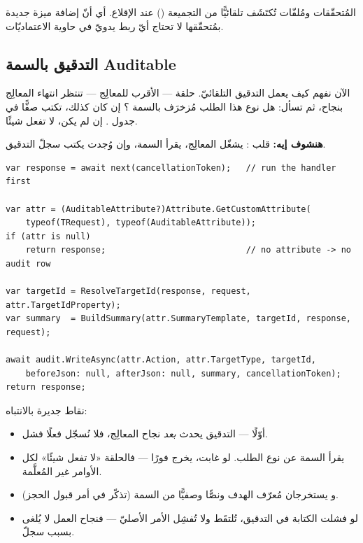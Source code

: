 \begin{note}
المُتحقّقات ومُلفّات  تُكتَشَف تلقائيًّا من التجميعة () عند
الإقلاع. أي أنّ إضافة ميزة جديدة بمُتحقّقها لا تحتاج أيّ ربط يدويّ في حاوية الاعتماديّات.
\end{note}

\subsection{التدقيق بالسمة Auditable}

الآن نفهم كيف يعمل التدقيق التلقائيّ. حلقة  — الأقرب للمعالِج — تنتظر انتهاء
المعالِج بنجاح، ثم تسأل: هل نوع هذا الطلب مُزخرَف بالسمة \code{[Auditable]}؟ إن كان
كذلك، تكتب صفًّا في جدول . إن لم يكن، لا تفعل شيئًا.

\textbf{هنشوف إيه:} قلب : يشغّل المعالِج، يقرأ السمة، وإن وُجدت يكتب
سجلّ التدقيق.

\begin{english}
\begin{lstlisting}[language={[Sharp]C}]
var response = await next(cancellationToken);   // run the handler first

var attr = (AuditableAttribute?)Attribute.GetCustomAttribute(
    typeof(TRequest), typeof(AuditableAttribute));
if (attr is null)
    return response;                            // no attribute -> no audit row

var targetId = ResolveTargetId(response, request, attr.TargetIdProperty);
var summary  = BuildSummary(attr.SummaryTemplate, targetId, response, request);

await audit.WriteAsync(attr.Action, attr.TargetType, targetId,
    beforeJson: null, afterJson: null, summary, cancellationToken);
return response;
\end{lstlisting}
\end{english}

نقاط جديرة بالانتباه:
\begin{itemize}
\item {} أوّلًا — التدقيق يحدث \emph{بعد} نجاح المعالِج، فلا نُسجّل
  فعلًا فشل.
\item {} يقرأ السمة عن نوع الطلب. لو غابت، يخرج فورًا — فالحلقة
  «لا تفعل شيئًا» لكل الأوامر غير المُعلَّمة.
\item {} و يستخرجان مُعرّف الهدف ونصًّا وصفيًّا من
  السمة (تذكّر  في أمر قبول الحجز).
\item لو فشلت الكتابة في التدقيق، تُلتقَط ولا تُفشِل الأمر الأصليّ — فنجاح العمل لا يُلغى
  بسبب سجلّ.
\end{itemize}

